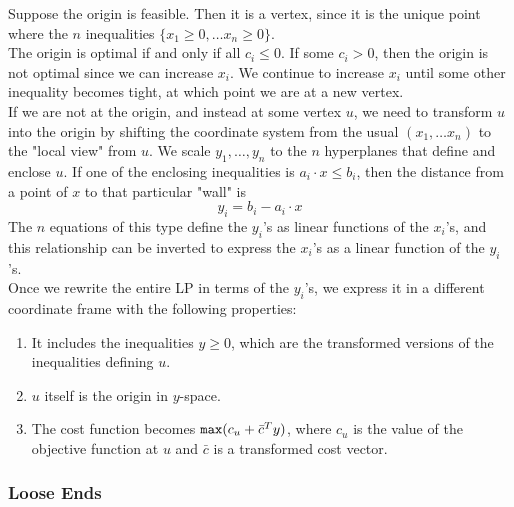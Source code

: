 Suppose the origin is feasible.
Then it is a vertex, since it is the unique point where the $n$ inequalities $\{x_1 \geq 0,\ldots x_n \geq 0\}$.\\
The origin is optimal if and only if all $c_i \leq 0$.
If some $c_i > 0$, then the origin is not optimal since we can increase $x_i$.
We continue to increase $x_i$ until some other inequality becomes tight, at which point we are at a new vertex.\\
If we are not at the origin, and instead at some vertex $u$, we need to transform $u$ into the origin by shifting the coordinate system from the usual $(x_1,\ldots x_n)$ to the "local view" from $u$.
We scale $y_1,\ldots, y_n$ to the $n$ hyperplanes that define and enclose $u$.
If one of the enclosing inequalities is $a_i \cdot x \leq b_i$, then the distance from a point of $x$ to that particular "wall" is $$y_i = b_i - a_i \cdot x$$
The $n$ equations of this type define the $y_i$'s as linear functions of the $x_i$'s, and this relationship can be inverted to express the $x_i$'s as a linear function of the $y_i$'s.\\
Once we rewrite the entire LP in terms of the $y_i$'s, we express it in a different coordinate frame with the following properties:
\begin{enumerate}
  \item It includes the inequalities $y \geq 0$, which are the transformed versions of the inequalities defining $u$.\\
  \item $u$ itself is the origin in $y$-space.\\
  \item The cost function becomes $\verb|max|(c_u + \bar{c} ^Ty)$, where $c_u$ is the value of the objective function at $u$ and $\bar{c}$ is a transformed cost vector.
\end{enumerate}

\subsubsection{Loose Ends}

